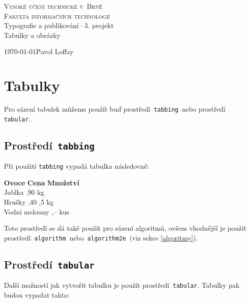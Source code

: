 \documentclass[11pt,a4paper,titlepage]{article}
\begin{document}
\begin{titlepage}
	\begin{center}
		{\Huge \textsc{Vysoké učení technické v~Brně\\}}
		{\huge \textsc{Fakulta informačních technologií\\}}
		\bigskip
		{\LARGE Typografie a publikování\,--\,3. projekt\\}
		{\Huge Tabulky a obrázky\\}
		\bigskip
	\end{center}
	\Large{\today \hfill Pavol Loffay}
	\bigskip
\end{titlepage}

\section{Tabulky}
	Pro sázení tabulek můžeme použít buď prostředí\texttt{ tabbing }nebo prostředí\texttt{ tabular}.

	\subsection{Prostředí\texttt{ tabbing}}
		Při použití \texttt{tabbing} vypadá tabulka následovně:
	\begin{tabbing}
		\textbf{Ovoce} \hspace{16mm}	\= \textbf{Cena} 	\quad 	\=  \textbf{Množství} \\
		Jablka							,90 					 kg\\
		Hrušky							,40					,5 kg\\
		Vodní melouny					,--					 kus \\
	\end{tabbing}

	\noindent Toto prostředí se dá také použít pro sázení algoritmů, ovšem vhodnější je použít 
	prostředí\texttt{ algorithm }nebo\texttt{ algorithm2e }(viz sekce \ref{algoritmy}).

	\subsection{Prostředí\texttt{ tabular}}
		Další možností jak vytvořit tabulku je použít prostředí\texttt{ tabular}. Tabulky pak budou vypadat takto:
		\bigskip
\end{document}
